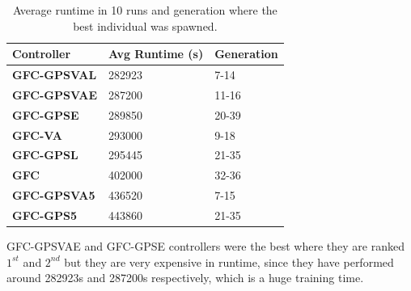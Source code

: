 \documentclass[10pt,journal,compsoc]{IEEEtran}
\begin{document}
\begin{table}[!ht]
	\centering
	{\scriptsize
          \caption{Average runtime in 10 runs
            and
                  generation where the best individual was spawned.}
		\label{tab:time}
		\begin{tabular}{|p{2.85cm}|p{2.20cm}|p{1.65cm}|}
			\hline  
			Controller& \textbf{Avg Runtime (s)}&\textbf{Generation}\\
\hline
\hline 	 
 \textbf{{\sf GFC-GPSVAL}} \cite{DBLP:conf/cig/SalemMG19}& 282923
&7-14\\	
\textbf{{\sf GFC-GPSVAE}}& 287200
&11-16\\
 \textbf{{\sf GFC-GPSE}}&	289850
&20-39\\
\textbf{{\sf GFC-VA}} \cite{DBLP:conf/cig/SalemMG19}&293000
&9-18\\
 \textbf{{\sf GFC-GPSL}} \cite{DBLP:conf/cig/SalemMG19}& 295445
&21-35\\
\textbf{\textbf{{\sf GFC}}} \cite{salem_cig2018}&402000
                   &32-36\\
\textbf{{\sf GFC-GPSVA5}} \cite{DBLP:conf/cig/SalemMG19}&	436520
&7-15\\	
	
 \textbf{{\sf GFC-GPS5}} \cite{DBLP:conf/cig/SalemMG19}&443860
				&21-35\\	
					
			\hline 
		
		\end{tabular}
		
	}
\end{table} 

{\sf GFC-GPSVAE} and {\sf GFC-GPSE} controllers were the best where
they are ranked $1^{st}$ and $2^{nd}$ but they are very expensive in runtime, since they have performed around 282923s and 287200s respectively, which is a
huge training time. %
                    
                 
\end{document}
